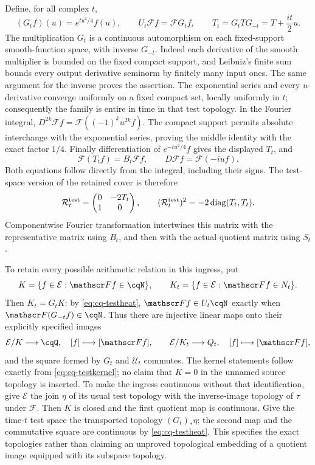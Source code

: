 Define, for all complex $t$,
\begin{equation}\label{eq:cq-testheat}
 (G_tf)(u)=e^{tu^2/4}f(u),\qquad
 U_t\mathscr Ff=\mathscr F G_tf,\qquad
 T_t=G_tTG_{-t}=T+\frac{it}{2}u.
\end{equation}
The multiplication $G_t$ is a continuous automorphism on each
fixed-support smooth-function space, with inverse $G_{-t}$.
Indeed each derivative of the smooth multiplier is bounded on the
fixed compact support, and Leibniz's finite sum bounds every output
derivative seminorm by finitely many input ones. The same argument
for the inverse proves the assertion. The exponential series and
every $u$-derivative converge uniformly on a fixed compact set,
locally uniformly in $t$; consequently the family is entire in time
in that test topology. In the Fourier integral,
$D^{2k}\mathscr Ff=\mathscr F((-1)^ku^{2k}f)$.
The compact support permits absolute interchange with the
exponential series, proving the middle identity with the exact
factor $1/4$. Finally differentiation of $e^{-tu^2/4}f$ gives
the displayed $T_t$, and
\[
 \mathscr F(T_tf)=B_t\mathscr Ff,
 \qquad D\mathscr Ff=\mathscr F(-iu f).
\]
Both equations follow directly from the integral, including their
signs. The test-space version of the retained cover is therefore
\[
 \mathcal R_t^{\rm test}
   =\begin{pmatrix}0&-2T_t\\1&0\end{pmatrix},\qquad
 (\mathcal R_t^{\rm test})^2=-2\operatorname{diag}(T_t,T_t).
\]
Componentwise Fourier transformation intertwines this matrix with
the representative matrix using $B_t$, and then with the actual
quotient matrix using $S_t$.

To retain every possible arithmetic relation in this ingress, put
\begin{equation}\label{eq:cq-testkernel}
 K=\{f\in\mathcal E:\mathscr Ff\in\cqN\},\qquad
 K_t=\{f\in\mathcal E:\mathscr Ff\in N_t\}.
\end{equation}
Then $K_t=G_tK$: by \eqref{eq:cq-testheat},
$\mathscr Ff\in U_t\cqN$ exactly when
$\mathscr F(G_{-t}f)\in\cqN$. Thus there are injective linear
maps onto their explicitly specified images
\[
 \mathcal E/K\longrightarrow\cqQ,\quad[f]\longmapsto[\mathscr Ff],
 \qquad
 \mathcal E/K_t\longrightarrow Q_t,\quad[f]\longmapsto[\mathscr Ff],
\]
and the square formed by $G_t$ and $\mathcal U_t$ commutes.
The kernel statements follow exactly from
\eqref{eq:cq-testkernel}; no claim that $K=0$ in the unnamed
source topology is inserted. To make the ingress continuous without
that identification, give $\mathcal E$ the join $\eta$ of its
usual test topology with the inverse-image topology of $\tau$
under $\mathscr F$. Then $K$ is closed and the first quotient map
is continuous. Give the time-$t$ test space the transported
topology $(G_t)_*\eta$; the second map and the commutative square
are continuous by \eqref{eq:cq-testheat}. This specifies the exact
topologies rather than claiming an unproved topological embedding
of a quotient image equipped with its subspace topology.

